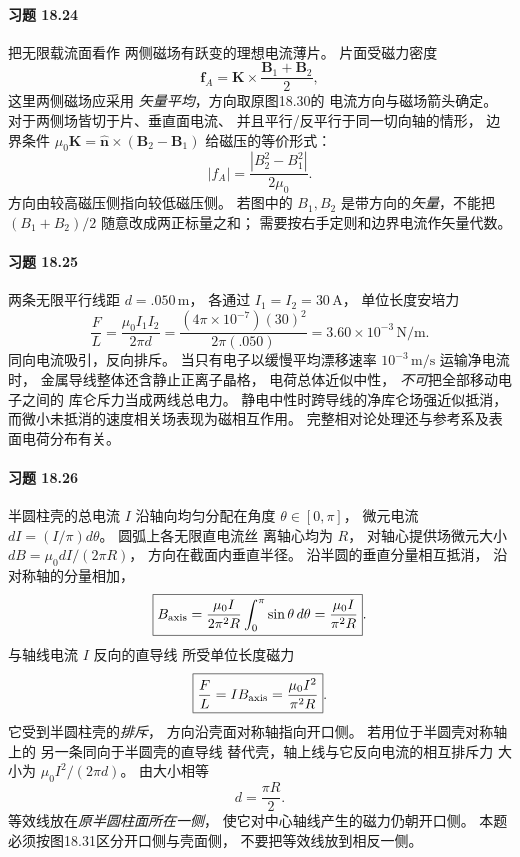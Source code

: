 \paragraph{习题 18.24}
把无限载流面看作
两侧磁场有跃变的理想电流薄片。
片面受磁力密度
\[
 \boxed{\boldsymbol f_A=
 \boldsymbol K\times
 \frac{\boldsymbol B_1+\boldsymbol B_2}{2}},
\]
这里两侧磁场应采用
\emph{矢量平均}，方向取原图18.30的
电流方向与磁场箭头确定。
对于两侧场皆切于片、垂直面电流、
并且平行/反平行于同一切向轴的情形，
边界条件
\(\mu_0\boldsymbol K
 =\hat{\boldsymbol n}\times
 (\boldsymbol B_2-\boldsymbol B_1)\)
给磁压的等价形式：
\[
 \boxed{|f_A|=\frac{|B_2^2-B_1^2|}{2\mu_0}}.
\]
方向由较高磁压侧指向较低磁压侧。
若图中的 \(B_1,B_2\)
是带方向的\emph{矢量}，不能把
\((B_1+B_2)/2\) 随意改成两正标量之和；
需要按右手定则和边界电流作矢量代数。

\paragraph{习题 18.25}
两条无限平行线距
\(d=.050\,\mathrm m\)，
各通过 \(I_1=I_2=30\,\mathrm A\)，
单位长度安培力
\[
 \boxed{\frac FL
 =\frac{\mu_0I_1I_2}{2\pi d}
 =\frac{(4\pi\times10^{-7})(30)^2}
 {2\pi(.050)}
 =3.60\times10^{-3}\,\mathrm{N/m}}.
\]
同向电流吸引，反向排斥。
当只有电子以缓慢平均漂移速率
\(10^{-3}\,\mathrm{m/s}\) 运输净电流时，
金属导线整体还含静止正离子晶格，
电荷总体近似中性，
\emph{不可}把全部移动电子之间的
库仑斥力当成两线总电力。
静电中性时跨导线的净库仑场强近似抵消，
而微小未抵消的速度相关场表现为磁相互作用。
完整相对论处理还与参考系及表面电荷分布有关。

\paragraph{习题 18.26}
半圆柱壳的总电流 \(I\)
沿轴向均匀分配在角度 \(\theta\in[0,\pi]\)，
微元电流
\(dI=(I/\pi)d\theta\)。
圆弧上各无限直电流丝
离轴心均为 \(R\)，
对轴心提供场微元大小
\(dB=\mu_0dI/(2\pi R)\)，
方向在截面内垂直半径。
沿半圆的垂直分量相互抵消，
沿对称轴的分量相加，
\[
 \boxed{B_{\rm axis}
 =\frac{\mu_0I}{2\pi^2R}
 \int_0^\pi\sin\theta\,d\theta
 =\frac{\mu_0I}{\pi^2R}}.
\]
与轴线电流 \(I\) 反向的直导线
所受单位长度磁力
\[
 \boxed{\frac FL
 =I B_{\rm axis}
 =\frac{\mu_0I^2}{\pi^2R}}.
\]
它受到半圆柱壳的\emph{排斥}，
方向沿壳面对称轴指向开口侧。
若用位于半圆壳对称轴上的
另一条同向于半圆壳的直导线
替代壳，轴上线与它反向电流的相互排斥力
大小为 \(\mu_0I^2/(2\pi d)\)。
由大小相等
\[
 \boxed{d=\frac{\pi R}{2}}.
\]
等效线放在\emph{原半圆柱面所在一侧}，
使它对中心轴线产生的磁力仍朝开口侧。
本题必须按图18.31区分开口侧与壳面侧，
不要把等效线放到相反一侧。

